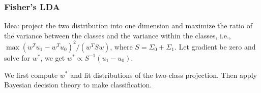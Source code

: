 \subsubsection*{Fisher's LDA}

Idea: project the two distribution into one dimension and maximize the ratio of the variance between the classes and the variance within the classes, i.e., $\max (w^T u_1-w^T u_0)^2/(w^T S w)$, where $S = \Sigma_0+\Sigma_1$. Let gradient be zero and solve for $w^*$, we get $w^*\propto S^{-1}(u_1-u_0)$.

We first compute $w^*$ and fit distributions of the two-class projection. Then apply Bayesian decision theory to make classification.
